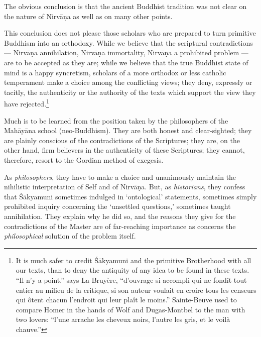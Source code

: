 \documentclass[a4paper, 11pt, oneside, english]{article}
\begin{document}
The obvious conclusion is that the ancient Buddhist tradition was not clear on the nature of Nirvāṇa as well as on many other points.

This conclusion does not please those scholars who are prepared to turn primitive Buddhism into an orthodoxy. While we believe that the scriptural contradictions --- Nirvāṇa annihilation, Nirvāṇa immortality, Nirvāṇa a prohibited problem --- are to be accepted as they are; while we believe that the true Buddhist state of mind is a happy syncretism, scholars of a more orthodox or less catholic temperament make a choice among the conflicting views; they deny, expressly or tacitly, the authenticity or the authority of the texts which support the view they have rejected.\footnote{It is much safer to credit Śākyamuni and the primitive Brotherhood with all our texts, than to deny the antiquity of any idea to be found in these texts. ``Il n'y a point.'' says La Bruyère, ``d'ouvrage si accompli qui ne fondît tout entier au milieu de la critique, si son auteur voulait en croire tous les censeurs qui ôtent chacun l'endroit qui leur plaît le moins.'' Sainte-Beuve used to compare Homer in the hands of Wolf and Dugas-Montbel to the man with two lovers: ``l'une arrache les cheveux noirs, l'autre les gris, et le voilà chauve.''}

Much is to be learned from the position taken by the philosophers of the Mahāyāna school (neo-Buddhism). They are both honest and clear-sighted; they are plainly conscious of the contradictions of the Scriptures; they are, on the other hand, firm believers in the authenticity of these Scriptures; they cannot, therefore, resort to the Gordian method of exegesis.

As \emph{philosophers}, they have to make a choice and unanimously maintain the nihilistic interpretation of Self and of Nirvāṇa. But, as \emph{historians}, they confess that Śākyamuni sometimes indulged in `ontological' statements, sometimes simply prohibited inquiry concerning the `unsettled questions,' sometimes taught annihilation. They explain why he did so, and the reasons they give for the contradictions of the Master are of far-reaching importance as concerns the \emph{philosophical} solution of the problem itself.
\end{document}
